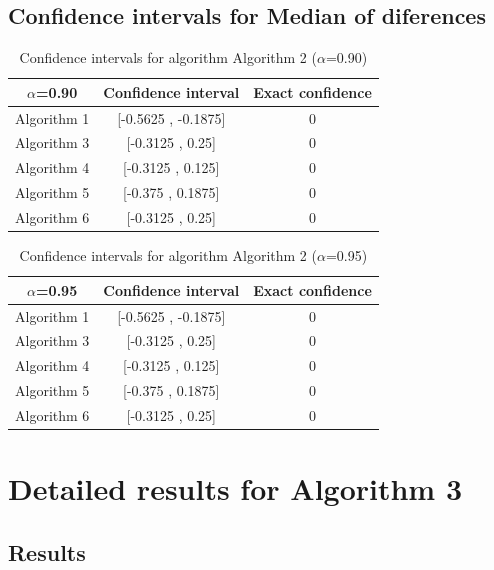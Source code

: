 \documentclass[a4paper,10pt]{article}
\begin{document}
\subsection{Confidence intervals for Median of diferences}

\begin{table}[!htp]
\centering\small
\begin{tabular}{
|c|c|c|}
\hline
 $\alpha$=0.90 & Confidence interval & Exact confidence \\ \hline 
Algorithm 1 & [-0.5625 , -0.1875] & 0\\ \hline 
Algorithm 3 & [-0.3125 , 0.25] & 0\\ \hline 
Algorithm 4 & [-0.3125 , 0.125] & 0\\ \hline 
Algorithm 5 & [-0.375 , 0.1875] & 0\\ \hline 
Algorithm 6 & [-0.3125 , 0.25] & 0\\ \hline 

\end{tabular}
\caption{Confidence intervals for algorithm Algorithm 2 ($\alpha$=0.90)}
\end{table}
\begin{table}[!htp]
\centering\small
\begin{tabular}{
|c|c|c|}
\hline
 $\alpha$=0.95 & Confidence interval & Exact confidence \\ \hline 
Algorithm 1 & [-0.5625 , -0.1875] & 0\\ \hline 
Algorithm 3 & [-0.3125 , 0.25] & 0\\ \hline 
Algorithm 4 & [-0.3125 , 0.125] & 0\\ \hline 
Algorithm 5 & [-0.375 , 0.1875] & 0\\ \hline 
Algorithm 6 & [-0.3125 , 0.25] & 0\\ \hline 

\end{tabular}
\caption{Confidence intervals for algorithm Algorithm 2 ($\alpha$=0.95)}
\end{table}

 \clearpage 


\section{Detailed results for Algorithm 3}


\subsection{Results}
\end{document}
